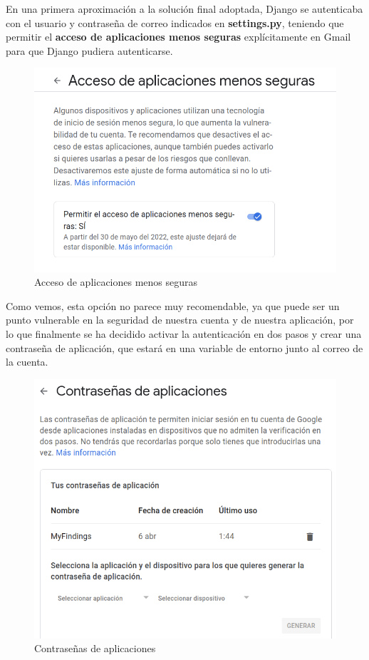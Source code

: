 En una primera aproximación a la solución final adoptada, Django se autenticaba con el
usuario y contraseña de correo indicados en \textbf{settings.py}, teniendo que permitir
el \textbf{acceso de aplicaciones menos seguras} explícitamente en Gmail para que Django
pudiera autenticarse.

    \begin{figure}[H]
        \centering
        \includegraphics[scale=0.38]{imagenes/apps-access.png}
        \caption{Acceso de aplicaciones menos seguras}
        \label{fig:apps-access}
    \end{figure}

Como vemos, esta opción no parece muy recomendable, ya que puede ser un punto vulnerable
en la seguridad de nuestra cuenta y de nuestra aplicación, por lo que finalmente se ha
decidido activar la autenticación en dos pasos y crear una contraseña de aplicación,
que estará en una variable de entorno junto al correo de la cuenta.

    \begin{figure}[H]
        \centering
        \includegraphics[scale=0.38]{imagenes/apps-pass.png}
        \caption{Contraseñas de aplicaciones}
        \label{fig:apps-pass}
    \end{figure}

